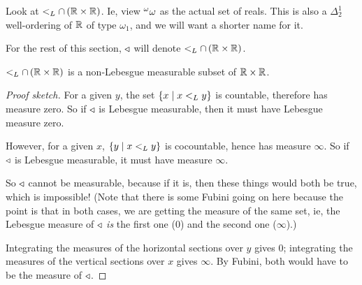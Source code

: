 Look at $<_L \cap \left( \mathbb{R} \times \mathbb{R} \right)$. Ie, view ${^{\omega}\omega}$ as the actual set of reals. This is also a $\Delta^1_2$ well-ordering of $\mathbb{R}$ of type $\omega_1$, and we will want a shorter name for it.

\begin{boxnotation}
    For the rest of this section, $\triangleleft$ will denote $<_L \cap \left( \mathbb{R} \times \mathbb{R} \right)$.
\end{boxnotation}

\begin{boxlemma}
    $<_L \cap \left( \mathbb{R} \times \mathbb{R} \right)$ is a non-Lebesgue measurable subset of $\mathbb{R} \times \mathbb{R}$.
\end{boxlemma}
\begin{proof}[Proof sketch]
    For a given $y$, the set $\left\{ x \; \middle\vert \; x <_L y \right\}$ is countable, therefore has measure zero. So if $\triangleleft$ is Lebesgue measurable, then it must have Lebesgue measure zero.
    
    However, for a given $x$, $\left\{ y \; \middle\vert \; x <_L y \right\}$ is cocountable, hence has measure $\infty$. So if $\triangleleft$ is Lebesgue measurable, it must have measure $\infty$.

    So $\triangleleft$ cannot be measurable, because if it is, then these things would both be true, which is impossible! (Note that there is some Fubini going on here because the point is that in both cases, we are getting the measure of the same set, ie, the Lebesgue measure of $\triangleleft$ \textit{is} the first one ($0$) and the second one ($\infty$).)
    \begin{figure}[H]
        \centering
    \end{figure}
    Integrating the measures of the horizontal sections over $y$ gives $0$; integrating the measures of the vertical sections over $x$ gives $\infty$. By Fubini, both would have to be the measure of $\triangleleft$.
\end{proof}
